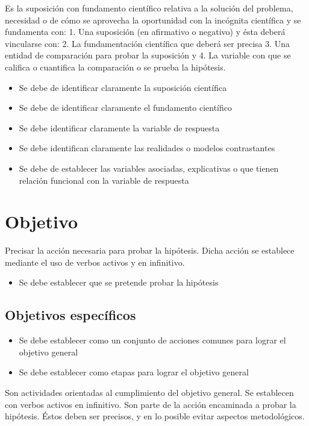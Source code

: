     Es la suposición con fundamento científico relativa a la solución del problema, necesidad o de cómo se aprovecha la oportunidad con la incógnita científica y se fundamenta con: 1. Una suposición (en afirmativo o negativo) y ésta deberá vincularse con:
    2. La fundamentación científica que deberá ser precisa 3. Una entidad de comparación para probar la suposición y
    4. La variable con que se califica o cuantifica la comparación o se prueba la hipótesis.
    
    \begin{itemize}
        \item Se debe de identificar claramente la suposición científica
        \item Se debe de identificar claramente el fundamento científico
        \item Se debe identificar claramente la variable de respuesta
        \item Se debe identifican claramente las realidades o modelos contrastantes
        \item Se debe de establecer las variables asociadas, explicativas o que tienen relación funcional con la variable de respuesta
    \end{itemize}
    \section{Objetivo}
    
    Precisar la acción necesaria para probar la hipótesis. Dicha acción se establece mediante el uso de verbos activos y en infinitivo.
    \begin{itemize}
        \item Se debe establecer que se pretende probar la hipótesis
    \end{itemize}
    
    \subsection{Objetivos específicos }
    
    \begin{itemize}
        \item Se debe establecer como un conjunto de acciones comunes para lograr el objetivo general
        \item Se debe establecer como etapas para lograr el objetivo general
    \end{itemize}
    
    Son actividades orientadas al cumplimiento del objetivo general. Se establecen con verbos activos en infinitivo. Son parte de la acción encaminada a probar la hipótesis. Éstos deben ser precisos, y en lo posible evitar aspectos metodológicos.
